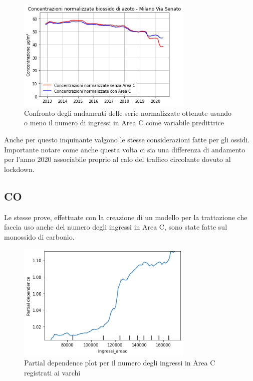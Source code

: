 \documentclass[a4paper]{report}
\begin{document}
\begin{figure}[h]
\centering
\includegraphics[width=0.75\textwidth]{no2_areac}
\caption{Confronto degli andamenti delle serie normalizzate ottenute usando o meno il numero di ingressi in Area C come variabile predittrice}
\label{fig:no2_areac}
\end{figure}

Anche per questo inquinante valgono le stesse considerazioni fatte per gli ossidi. Importante notare come anche questa volta ci sia una differenza di andamento per l'anno 2020 associabile proprio al calo del traffico circolante dovuto al lockdown.

\subsection{CO}
Le stesse prove, effettuate con la creazione di un modello per la trattazione che faccia uso anche del numero degli ingressi in Area C, sono state fatte sul monossido di carbonio.

\begin{figure}[h]
\centering
\includegraphics[width=0.75\textwidth]{co_part_dep}
\caption{Partial dependence plot per il numero degli ingressi in Area C registrati ai varchi}
\label{fig:co_part_dep}
\end{figure}
\end{document}
